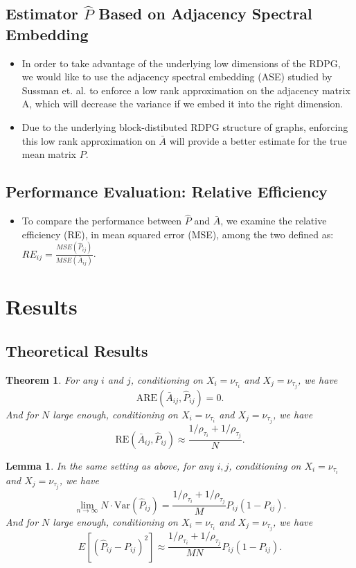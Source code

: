 \documentclass[a4paper]{article}
\newtheorem{lemma}[fact]{Lemma}
\newtheorem{theorem}[fact]{Theorem}
\begin{document}
\subsection{Estimator $\hat{P}$ Based on Adjacency Spectral Embedding}
\begin{itemize}
\item In order to take advantage of the underlying low dimensions of the RDPG, we would like to use the adjacency spectral embedding (ASE) studied by Sussman et. al. to enforce a low rank approximation on the adjacency matrix A, which will decrease the variance if we embed it into the right dimension.
\item Due to the underlying block-distibuted RDPG structure of graphs, enforcing this low rank approximation on $\bar{A}$ will provide a better estimate for the true mean matrix $P$.
\end{itemize}

\subsection{Performance Evaluation: Relative Efficiency}
\begin{itemize}
\item To compare the performance between $\hat{P}$ and $\bar{A}$, we examine the relative efficiency (RE), in mean squared error (MSE), among the two defined as: $RE_{ij} = \frac{MSE(\hat{P}_{ij})}{MSE(\bar{A}_{ij})}$.
\end{itemize}


\section{Results}

\subsection{Theoretical Results}
\begin{theorem}
\label{thm:ARE}
For any $i$ and $j$, conditioning on $X_i = \nu_{\tau_i}$ and $X_j = \nu_{\tau_j}$, we have
\[
	\mathrm{ARE}(\bar{A}_{ij}, \hat{P}_{ij}) = 0.
\]
And for $N$ large enough, conditioning on $X_i = \nu_{\tau_i}$ and $X_j = \nu_{\tau_j}$, we have
\[
	\mathrm{RE}(\bar{A}_{ij}, \hat{P}_{ij}) \approx
    \frac{1/\rho_{\tau_i} + 1/\rho_{\tau_j}}{N}.
\]
\end{theorem}

\begin{lemma}
\label{lm:VarPhat}
In the same setting as above, for any $i, j$, conditioning on $X_i = \nu_{\tau_i}$ and $X_j = \nu_{\tau_j}$, we have
\[
	\lim_{n \to \infty} N \cdot \mathrm{Var}(\hat{P}_{ij}) =
    \frac{1/\rho_{\tau_i} + 1/\rho_{\tau_j}}{M} P_{ij} (1 - P_{ij}).
\]
And for $N$ large enough, conditioning on $X_i = \nu_{\tau_i}$ and $X_j = \nu_{\tau_j}$, we have
\[
	E[(\hat{P}_{ij} - P_{ij})^2] \approx
    \frac{1/\rho_{\tau_i} + 1/\rho_{\tau_j}}{M N} P_{ij}(1-P_{ij}).
\]
\end{lemma}
\end{document}
